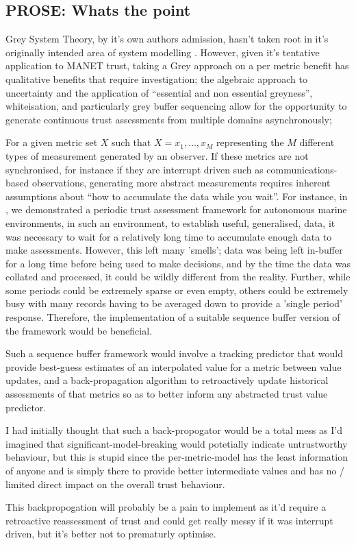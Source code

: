 \subsection{PROSE: Whats the point}

Grey System Theory, by it's own authors admission, hasn't taken root in it's originally intended area of system modelling \cite{Liu2011}.
However, given it's tentative application to MANET trust, taking a Grey approach on a per metric benefit has qualitative benefits that require investigation; the algebraic approach to uncertainty and the application of ``essential and non essential greyness'', whiteisation, and particularly grey buffer sequencing allow for the opportunity to generate continuous trust assessments from multiple domains asynchronously;

For a given metric set $X$ such that $X = {x_1,\dots,x_M}$ representing the $M$ different types of measurement generated by an observer. If these metrics are not synchronised, for instance if they are interrupt driven such as communications-based observations, generating more abstract measurements requires inherent assumptions about ``how to accumulate the data while you wait''. For instance, in \cite{Bolster2015}, we demonstrated a periodic trust assessment framework for autonomous marine environments, in such an environment, to establish useful, generalised, data, it was necessary to wait for a relatively long time to accumulate enough data to make assessments.
However, this left many 'smells'; data was being left in-buffer for a long time before being used to make decisions, and by the time the data was collated and processed, it could be wildly different from the reality. Further, while some periods could be extremely sparse or even empty, others could be extremely busy with many records having to be averaged down to provide a 'single period' response. 
Therefore, the implementation of a suitable sequence buffer version of the framework would be beneficial.

Such a sequence buffer framework would involve a tracking predictor that would provide best-guess estimates of an interpolated value for a metric between value updates, and a back-propagation algorithm to retroactively update historical assessments of that metrics so as to better inform any abstracted trust value predictor.

I had initially thought that such a back-propogator would be a total mess as I'd imagined that significant-model-breaking would potetially indicate untrustworthy behaviour, but this is stupid since the per-metric-model has the least information of anyone and is simply there to provide better intermediate values and has no / limited direct impact on the overall trust behaviour. 

This backpropogation will probably be a pain to implement as it'd require a retroactive reassessment of trust and could get really messy if it was interrupt driven, but it's better not to prematurly optimise.


\ifx\ifthesis\undefined
	
\else
\fi
